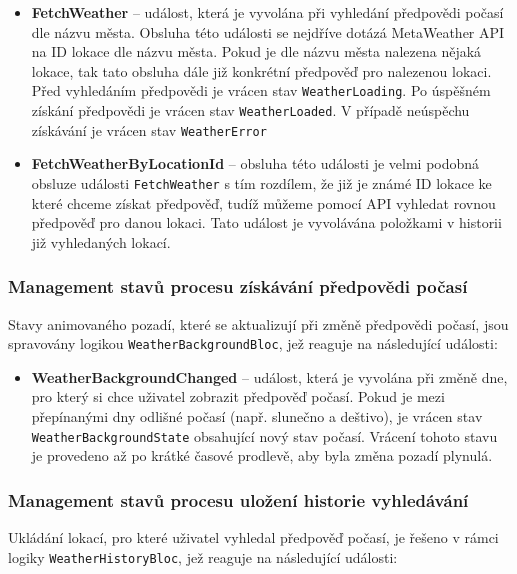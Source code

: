 \documentclass[12pt, a4paper]{article}
\begin{document}
\begin{itemize}
	\item \textbf{FetchWeather} -- událost, která je vyvolána při vyhledání předpovědi počasí dle názvu města. Obsluha této události se nejdříve dotázá MetaWeather API na ID lokace dle názvu města. Pokud je dle názvu města nalezena nějaká lokace, tak tato obsluha dále již konkrétní předpověď pro nalezenou lokaci. Před vyhledáním předpovědi je vrácen stav \texttt{WeatherLoading}. Po úspěšném získání předpovědi je vrácen stav \texttt{WeatherLoaded}. V případě neúspěchu získávání je vrácen stav \texttt{WeatherError}
	\item \textbf{FetchWeatherByLocationId} -- obsluha této události je velmi podobná obsluze události \texttt{FetchWeather} s tím rozdílem, že již je známé ID lokace ke které chceme získat předpověď, tudíž můžeme pomocí API vyhledat rovnou předpověď pro danou lokaci. Tato událost je vyvolávána položkami v historii již vyhledaných lokací.

\end{itemize}

\subsubsection{Management stavů procesu získávání předpovědi počasí}

Stavy animovaného pozadí, které se aktualizují při změně předpovědi počasí, jsou spravovány logikou \texttt{WeatherBackgroundBloc}, jež reaguje na následující události:

\begin{itemize}

	\item \textbf{WeatherBackgroundChanged} -- událost, která je vyvolána při změně dne, pro který si chce uživatel zobrazit předpověď počasí. Pokud je mezi přepínanými dny odlišné počasí (např. slunečno a deštivo), je vrácen stav \texttt{WeatherBackgroundState} obsahující nový stav počasí. Vrácení tohoto stavu je provedeno až po krátké časové prodlevě, aby byla změna pozadí plynulá.

\end{itemize}


\subsubsection{Management stavů procesu uložení historie vyhledávání}

Ukládání lokací, pro které uživatel vyhledal předpověď počasí, je řešeno v rámci logiky \texttt{WeatherHistoryBloc}, jež reaguje na následující události:
\end{document}

